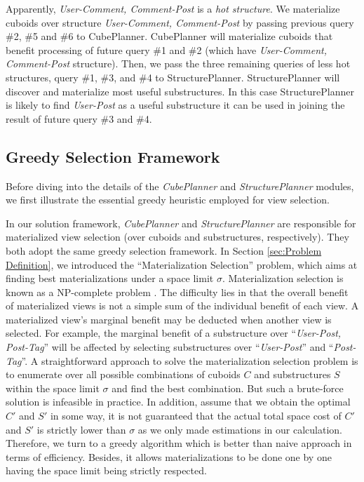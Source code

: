 	Apparently,  \textit{User-Comment, Comment-Post} is a \emph{hot structure}. We materialize cuboids over structure \textit{User-Comment, Comment-Post} by passing previous query \#2, \#5 and \#6 to CubePlanner. CubePlanner will materialize cuboids that benefit processing of future query \#1 and \#2 (which have \textit{User-Comment, Comment-Post} structure). Then, we pass the three remaining queries of less hot structures, query \#1, \#3, and \#4 to StructurePlanner. StructurePlanner will discover and materialize most useful substructures. In this case StructurePlanner is likely to find \textit{User-Post} as a useful substructure it can be used in joining the result of future query \#3 and \#4.
	
	
	\subsection{Greedy Selection Framework}
	\label{s:Greedy Selection Framework}
	
	Before diving into the details of the \emph{CubePlanner} and \emph{StructurePlanner} modules, we first illustrate the essential greedy heuristic employed for view selection. %
	
	In our solution framework, \emph{CubePlanner} and \emph{StructurePlanner} are responsible for materialized view selection (over cuboids and substructures, respectively). They both adopt the same greedy selection framework. In Section \ref{sec:Problem Definition}, we introduced the ``Materialization Selection'' problem, which aims at finding best materializations under a space limit $\sigma$. Materialization selection is known as a NP-complete problem \cite{DBLP:journals/kais/LinK04}. The difficulty lies in that the overall benefit of materialized views is not a simple sum of the individual benefit of each view. A materialized view's marginal benefit may be deducted when another view is selected. For example, the marginal benefit of a substructure over ``\textit{User-Post, Post-Tag}'' will be affected by selecting substructures over ``\textit{User-Post}'' and ``\textit{Post-Tag}''. A straightforward approach to solve the materialization selection problem is to enumerate over all possible combinations of cuboids $C$ and substructures $S$ within the space limit $\sigma$ and find the best combination. But such a brute-force solution is infeasible in practice. In addition, assume that we obtain the optimal $C'$ and $S'$ in some way, it is not guaranteed that the actual total space cost of $C'$ and $S'$ is strictly lower than $\sigma$ as we only made estimations in our calculation. Therefore, we turn to a greedy algorithm which is better than naive approach in terms of efficiency. Besides, it allows materializations to be done one by one having the space limit being strictly respected.
	
